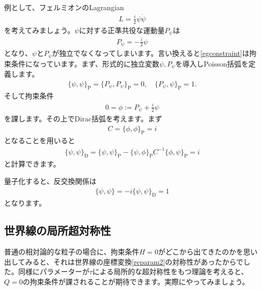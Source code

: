\documentclass[report,paper=a4, fontsize=12pt, line_length=16cm, number_of_lines=33,dvipdfmx]{jlreq}
\numberwithin{equation}{chapter}
\numberwithin{equation}{section}
\newcommand{\pbk}[1]{\{#1\}_{\mathrm{P}}}
\newcommand{\dbk}[1]{\{#1\}_{\mathrm{D}}}
\begin{document}
例として、フェルミオンのLagrangian
\begin{align}
  L=\frac{i}{2}\psi \dot{\psi}
\end{align}
を考えてみましょう。$\psi$に対する正準共役な運動量$P_{\psi}$は
\begin{align}
  P_{\psi}=-\frac{i}{2}\psi\label{egconstraint}
\end{align}
となり、$\psi$と$P_{\psi}$が独立でなくなってしまいます。言い換えると\eqref{egconstraint}は拘束条件になっています。まず、形式的に独立変数$\psi,P_{\psi}$を導入しPoisson括弧を定義します。
\begin{align}
  \pbk{\psi,\psi}=\pbk{P_{\psi},P_{\psi}}=0,\quad \pbk{P_{\psi},\psi}=1.
\end{align}
そして拘束条件
\begin{align}
  0=\phi:=P_{\psi}+\frac{i}{2}\psi
\end{align}
を課します。その上でDirac括弧を考えます。まず
\begin{align}
  C=\pbk{\phi,\phi}=i
\end{align}
となることを用いると
\begin{align}
  \dbk{\psi,\psi}=\pbk{\psi,\psi}-\pbk{\psi,\phi}C^{-1}\pbk{\phi,\psi}=i
\end{align}
と計算できます。

量子化すると、反交換関係は
\begin{align}
  \{\psi,\psi\}=-i\dbk{\psi,\psi}=1
\end{align}
となります。

\subsection{世界線の局所超対称性}
普通の相対論的な粒子の場合に、拘束条件$H=0$がどこから出てきたのかを思い出してみると、それは世界線の座標変換\eqref{reparam2}の対称性があったからでした。同様にパラメーターが$\tau$による局所的な超対称性をもつ理論を考えると、$Q=0$の拘束条件が課されることが期待できます。実際にやってみましょう。
\end{document}
